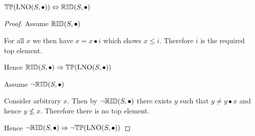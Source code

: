 \begin{theorem} \label{thm:lno_top}
${\mathbb{TP}}(\mathrm{LNO}(S,\bullet)) \Leftrightarrow {\mathbb{RID}}(S, \bullet)$
\end{theorem}

\begin{proof}

\vspace{0.5em}

Assume ${\mathbb{RID}}(S,\bullet)$
\begin{ind}
For all $x$ we then have $x = x \bullet i$ which shows $x \leq i$. Therefore $i$ is the required top element.
\end{ind}
Hence ${\mathbb{RID}}(S,\bullet) \Rightarrow {\mathbb{TP}}(\mathrm{LNO}(S,\bullet))$

\vspace{2em}

Assume $\neg {\mathbb{RID}}(S,\bullet)$
\begin{ind}
Consider arbitrary $x$. Then by $\neg {\mathbb{RID}}(S,\bullet)$ there exists $y$ such that $y \neq y \bullet x$ and hence $y \nleq x$. Therefore there is no top element.
\end{ind}
Hence $\neg {\mathbb{RID}}(S,\bullet) \Rightarrow \neg {\mathbb{TP}}(\mathrm{LNO}(S,\bullet))$
\end{proof}


